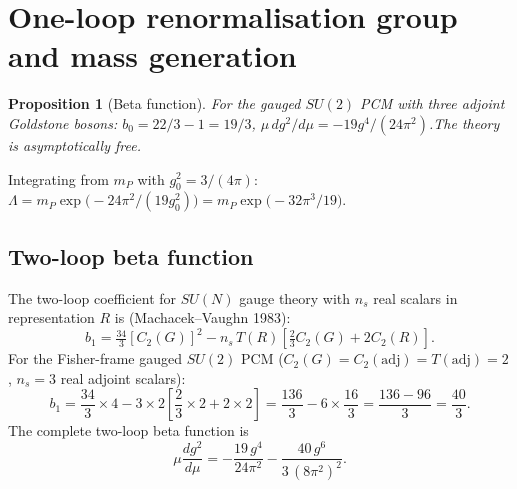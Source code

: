 \documentclass[12pt]{article}
\newtheorem{proposition}[theorem]{Proposition}
\theoremstyle{definition}
\theoremstyle{remark}
\begin{document}
\section{One-loop renormalisation group and mass generation}
\label{sec:rg}

\begin{proposition}[Beta function]\label{prop:beta}
For the gauged $SU(2)$ PCM with three adjoint Goldstone bosons:
$b_0=22/3-1=19/3$,\;
$\mu\,dg^2/d\mu=-19g^4/(24\pi^2)$.\quad The theory is asymptotically free.
\end{proposition}

Integrating from $m_P$ with $g_0^2=3/(4\pi)$:
$\Lambda=m_P\exp\!\bigl(-24\pi^2/(19g_0^2)\bigr)=m_P\exp\!\bigl(-32\pi^3/19\bigr)$.

\subsection{Two-loop beta function}

The two-loop coefficient for $SU(N)$ gauge theory with $n_s$ real scalars
in representation $R$ is (Machacek--Vaughn 1983):
\begin{equation}
  b_1 = \tfrac{34}{3}[C_2(G)]^2
        - n_s\,T(R)\!\left[\tfrac{2}{3}C_2(G)+2C_2(R)\right].
\end{equation}
For the Fisher-frame gauged $SU(2)$ PCM ($C_2(G)=C_2(\mathrm{adj})=T(\mathrm{adj})=2$,
$n_s=3$ real adjoint scalars):
\begin{equation}
  b_1 = \frac{34}{3}\times 4
        - 3\times 2\!\left[\frac{2}{3}\times 2+2\times 2\right]
      = \frac{136}{3} - 6\times\frac{16}{3}
      = \frac{136-96}{3}
      = \boxed{\frac{40}{3}.}
\end{equation}
The complete two-loop beta function is
\begin{equation}
  \mu\frac{dg^2}{d\mu}
  = -\frac{19\,g^4}{24\pi^2}
    -\frac{40\,g^6}{3\,(8\pi^2)^2}.
\label{eq:beta2loop}
\end{equation}
\end{document}
